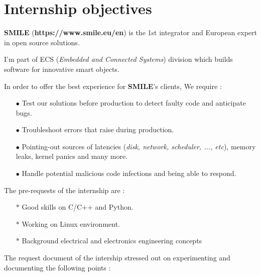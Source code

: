 \section{Internship objectives}

\textbf{SMILE} (\textbf{{\color{blue}https://www.smile.eu/en}}) is the 1st integrator and European expert in open source solutions. 

\begin{center} \color{red}
I'm part of ECS (\textit{Embedded and Connected Systems}) division which builds software for innovative smart objects.
\end{center}

In order to offer the best experience for \textbf{SMILE}'s clients, We require :

\begin{itemize}
\item[$\bullet$] Test our solutions before production to detect faulty code and anticipate bugs.
\item[$\bullet$] Troubleshoot errors that raise during production. 
\item[$\bullet$] Pointing-out sources of latencies (\emph{disk, network, scheduler, ..., etc}), memory leaks, kernel panics and many more.
\item[$\bullet$] Handle potential malicious code infections and being able to respond.
\end{itemize}  
\vspace{15px}

The pre-requests of the internship are : 
\begin{itemize}
	\item[$\ast$] {Good skills on C/C++ and Python.}
	\item[$\ast$] {Working on Linux environment.}
	\item[$\ast$] {Background electrical and electronics engineering concepts}
\end{itemize}


\vspace{15px}
The request document of the intership stressed out on experimenting and documenting the following points :


